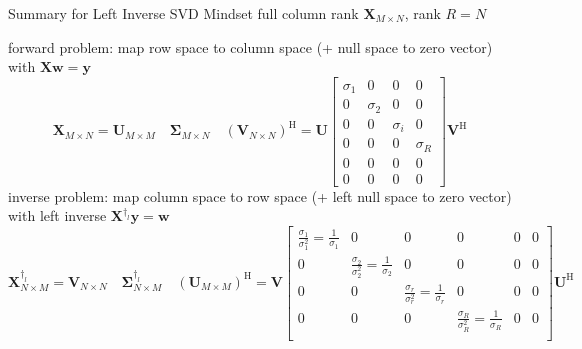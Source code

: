 \documentclass[mathserif, aspectratio=1610]{intbeamer}
\begin{document}
\begin{frame}{Summary for Left Inverse SVD Mindset}
full column rank $\bm{X}_{M \times N}$, rank $R=N$

forward problem: map row space to column space (+ null space to zero vector) with $\bm{X} \bm{w} = \bm{y}$
$$
\bm{X}_{M \times N}
=
\bm{U}_{M \times M}\quad
\bm{\Sigma}_{M \times N}\quad
(\bm{V}_{N \times N})^\mathrm{H}=
\bm{U}
\begin{bmatrix}
\sigma_1  & 0  & 0 & 0\\
0 & \sigma_2 & 0 & 0\\
0 & 0 & \sigma_i & 0\\
0 & 0 & 0 & \sigma_R\\
0 & 0 & 0 & 0\\
0 & 0 & 0 & 0
\end{bmatrix}
\bm{V}^\mathrm{H}
$$
inverse problem: map column space to row space (+ left null space to zero vector) with left inverse $\bm{X}^{\dagger_l} \bm{y} = \bm{w}$
$$
\bm{X}^{\dagger_l}_{N \times M}
=
\bm{V}_{N \times N}\quad
\bm{\Sigma}^{\dagger_l}_{N \times M}\quad
(\bm{U}_{M \times M})^\mathrm{H}
=
\bm{V}
\begin{bmatrix}
\frac{\sigma_1}{\sigma_1^2}=\frac{1}{\sigma_1} & 0 & 0 & 0 & 0 & 0\\
0 & \frac{\sigma_2}{\sigma_2^2}=\frac{1}{\sigma_2} & 0 & 0 & 0 & 0\\
0 & 0 & \frac{\sigma_r}{\sigma_r^2}=\frac{1}{\sigma_r} & 0 & 0 & 0\\
0 & 0 & 0 & \frac{\sigma_R}{\sigma_R^2}=\frac{1}{\sigma_R} & 0 & 0\\
\end{bmatrix}
\bm{U}^\mathrm{H}
$$






\end{frame}
\end{document}
